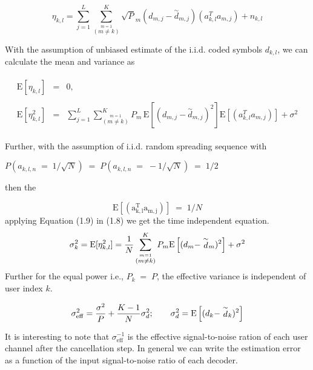 \begin{equation}
\eta_{k,l}=\sum\limits_{j=1}^{L}\sum\limits_{\stackrel{m=1}{(m\neq k)}}^{K} \sqrt{P}_m(d_{m,j}-\stackrel{\sim}{d}_{m,j})(a_{k,l}^Ta_{m,j})+n_{k,l}
\end{equation}

With the assumption of unbiased estimate of the i.i.d. coded symbols $d_{k,l}$, we can calculate the mean and variance as

\begin{eqnarray}
\begin{array}{rll}
\mathrm{E}[\eta_{k,l}]&=&0, \\ \\
\mathrm{E}[\eta_{k,l}^2]&=&\sum\limits_{j=1}^{L}\sum\limits_{\stackrel{m=1}{(m\neq k)}}^{K}P_m\,\mathrm{E}\left[(d_{m,j}-\stackrel{\sim}{d}_{m,j})^2\right] \mathrm{E}\left[(a_{k,l}^T a_{m,j})\right]+\sigma^2
\end{array}
\end{eqnarray}

Further, with the assumption of i.i.d. random spreading sequence with \begin{small}$P(a_{k,l,n}\;=\;1/\sqrt{N})\;=\;P(a_{k,l,n}\;=\;-1/\sqrt{N})\;=\;1/2$\end{small} then the 

\begin{equation}
\mathrm{E\left[\left(a_{k,l}^Ta_{m,j}\right)\right]}\;=\;1/N
\end{equation}
applying Equation (1.9) in (1.8) we get the time independent equation.
\begin{equation}
\sigma_k^2=\mathrm{E}[\eta_{k,l}^2]=\frac{\hbox{$1$}}{\hbox{$N$}} \sum\limits_{\stackrel{m=1}{(m\neq k)}}^{K} P_m \mathrm{E}\left[(d_m-\stackrel{\sim}{d}_m)^2\right]+\sigma^2
\end{equation}
Further for the equal power i.e., $P_k\;=\;P$, the effective variance is independent of user index $k$.

\begin{equation}
\sigma_{\mathrm{eff}}^2=\frac{\hbox{$\sigma^2$}}{\hbox{$P$}}+\frac{\hbox{$K-1$}}{\hbox{$N$}}\sigma_d^2;\hspace{7mm}\sigma_d^2=\mathrm{E}\left[(d_k-\stackrel{\sim}{d}_k)^2\right]
\end{equation}

It is interesting to note that $\sigma_{\mathrm{eff}}^{-1}$ is the effective signal-to-noise ration of each user channel after the cancellation step. In general we can write the estimation error as a function of the input signal-to-noise ratio of each decoder. 

